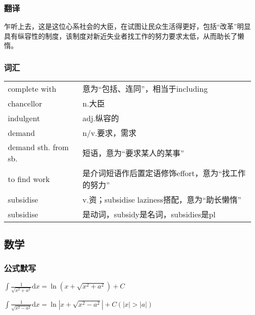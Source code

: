 \documentclass[UTF8]{ctexart}
\begin{document}
\subsubsection{翻译}
乍听上去，这是这位心系社会的大臣，在试图让民众生活得更好，包括“改革”明显具有纵容性的制度，该制度对新近失业者找工作的努力要求太低，从而助长了懒惰。
\subsubsection{词汇}
\begin{table}[h]
      \centering
      \begin{tabular}{p{}p{}}
            complete with        & 意为“包括、连同”，相当于including            \\
            chancellor           & n.大臣                              \\
            indulgent            & adj.纵容的                           \\
            demand               & n/v.要求，需求                         \\
            demand sth. from sb. & 短语，意为“要求某人的某事”                    \\
            to find work         & 是介词短语作后置定语修饰effort，意为“找工作的努力”     \\
            subsidise            & v.资；subsidise laziness搭配，意为“助长懒惰” \\
            subsidise            & 是动词，subsidy是名词，subsidies是pl
      \end{tabular}
\end{table}
\subsection{数学}
\subsubsection{公式默写}
$\int\frac{1}{\sqrt{x^2+a^2}}\mathrm{d}x=\ln(x+\sqrt{x^2+a^2})+C$

$\int\frac{1}{\sqrt{x^2-a^2}}\mathrm{d}x=\ln|x+\sqrt{x^2-a^2}|+C(|x|>|a|)$

\end{document}
